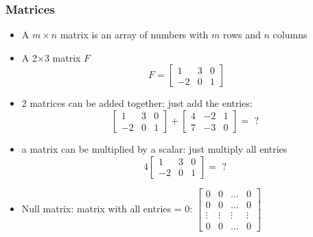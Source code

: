 \documentclass[8pt,dvipsnames]{beamer}
\newcommand{\myemph}[1]{{\color{blue}{#1}}}
\begin{document}
\begin{frame}
  \frametitle{Matrices}
  \begin{itemize}
  \item A $m\times n$ matrix is an array of numbers with $m$ rows and $n$ columns
  \item A 2$\times 3$ matrix $F$
    $$
    F =
    \begin{bmatrix}
      1 & 3 & 0\\
      -2 & 0 & 1
    \end{bmatrix}
    $$
  \item 2 matrices \myemph{of the same size} can be added together: just add the entries:
    $$    
    \begin{bmatrix}
      1 & 3 & 0\\
      -2 & 0 & 1
    \end{bmatrix}+
    \begin{bmatrix}
      4 & -2 & 1\\
      7 & -3 & 0
    \end{bmatrix}
    =
    \text{ ? }
    $$\item a matrix can be multiplied by a scalar: just multiply all entries
    $$ 4   
    \begin{bmatrix}
      1 & 3 & 0\\
      -2 & 0 & 1
    \end{bmatrix}=
    \text{ ? }
    $$
  \item Null matrix: matrix with all  entries = 0: $
    \begin{bmatrix}
      0 & 0 &\hdots & 0\\
      0 & 0 &\hdots & 0\\
      \vdots & \vdots & \vdots & \vdots\\
      0 & 0 &\hdots & 0
    \end{bmatrix}
    $
  \end{itemize}
\end{frame}
\end{document}
